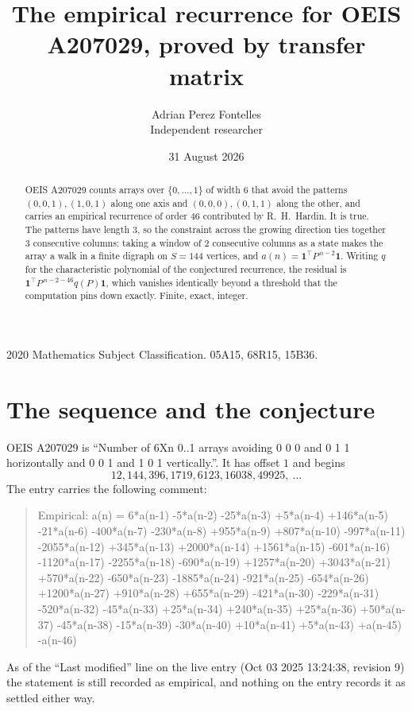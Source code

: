\documentclass[11pt,a4paper]{article}
\title{The empirical recurrence for OEIS A207029, proved by transfer matrix}
\author{Adrian Perez Fontelles\\ \small Independent researcher}
\date{31 August 2026}
\theoremstyle{plain}
\theoremstyle{definition}
\begin{document}
\maketitle

\begin{abstract}
OEIS A207029 counts arrays over $\{0,\dots,1\}$ of width $6$ that avoid the patterns
$(0,0,1), (1,0,1)$ along one axis and $(0,0,0), (0,1,1)$ along the other, and carries an empirical recurrence of
order $46$ contributed by R.~H.~Hardin. It is true. The patterns have length $3$, so
the constraint across the growing direction ties together $3$ consecutive columns: taking a
window of $2$ consecutive columns as a state makes the array a walk in a finite digraph
on $S=144$ vertices, and $a(n)=\mathbf{1}^{\!\top}P^{\,n-2}\mathbf{1}$. Writing $q$
for the characteristic polynomial of the conjectured recurrence, the residual is
$\mathbf{1}^{\!\top}P^{\,n-2-46}q(P)\mathbf{1}$, which vanishes identically
beyond a threshold that the computation pins down exactly. Finite, exact, integer.
\end{abstract}

\noindent\small 2020 Mathematics Subject Classification. 05A15, 68R15, 15B36.\normalsize

\section{The sequence and the conjecture}

OEIS A207029 is ``Number of 6Xn 0..1 arrays avoiding 0 0 0 and 0 1 1 horizontally and 0 0 1 and 1 0 1 vertically.''. It has offset
$1$ and begins
\[
12, 144, 396, 1719, 6123, 16038, 49925,\ \dots
\]
The entry carries the following comment:
\begin{quote}\small
Empirical: a(n) = 6*a(n-1) -5*a(n-2) -25*a(n-3) +5*a(n-4) +146*a(n-5) -21*a(n-6) -400*a(n-7) -230*a(n-8) +955*a(n-9) +807*a(n-10) -997*a(n-11) -2055*a(n-12) +345*a(n-13) +2000*a(n-14) +1561*a(n-15) -601*a(n-16) -1120*a(n-17) -2255*a(n-18) -690*a(n-19) +1257*a(n-20) +3043*a(n-21) +570*a(n-22) -650*a(n-23) -1885*a(n-24) -921*a(n-25) -654*a(n-26) +1200*a(n-27) +910*a(n-28) +655*a(n-29) -421*a(n-30) -229*a(n-31) -520*a(n-32) -45*a(n-33) +25*a(n-34) +240*a(n-35) +25*a(n-36) +50*a(n-37) -45*a(n-38) -15*a(n-39) -30*a(n-40) +10*a(n-41) +5*a(n-43) +a(n-45) -a(n-46)
\end{quote}
As of the ``Last modified'' line on the live entry (Oct 03 2025 13:24:38, revision
9) the statement is still recorded as empirical, and nothing on the entry
records it as settled either way.
\end{document}
